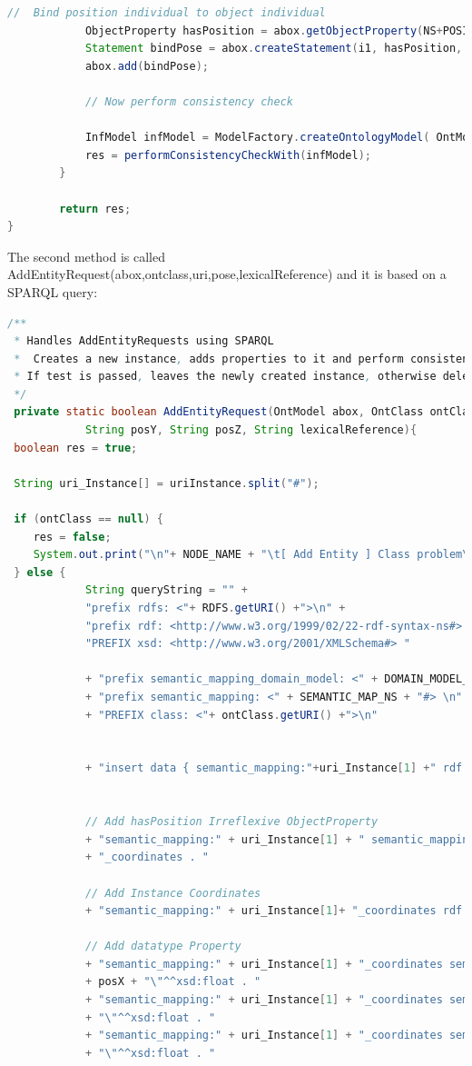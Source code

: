 \begin{lstlisting}[language=Java]
			//  Bind position individual to object individual
			ObjectProperty hasPosition = abox.getObjectProperty(NS+POSITION);
			Statement bindPose = abox.createStatement(i1, hasPosition, coordinatesInd);
			abox.add(bindPose);
			
			// Now perform consistency check

		    InfModel infModel = ModelFactory.createOntologyModel( OntModelSpec.OWL_MEM_MICRO_RULE_INF, abox);
			res = performConsistencyCheckWith(infModel);
		}
		
		return res;
}
\end{lstlisting}

The second method is called AddEntityRequest(abox,ontclass,uri,pose,lexicalReference) and it is based on a SPARQL query:

\begin{lstlisting}[language=Java]
/**
 * Handles AddEntityRequests using SPARQL
 *	Creates a new instance, adds properties to it and perform consistency check
 * If test is passed, leaves the newly created instance, otherwise deletes it
 */
 private static boolean AddEntityRequest(OntModel abox, OntClass ontClass, String uriInstance, String posX,
			String posY, String posZ, String lexicalReference){
 boolean res = true;
		
 String uri_Instance[] = uriInstance.split("#");
		
 if (ontClass == null) {
    res = false;
	System.out.print("\n"+ NODE_NAME + "\t[ Add Entity ] Class problem\n");
 } else {
			String queryString = "" + 
			"prefix rdfs: <"+ RDFS.getURI() +">\n" +
			"prefix rdf: <http://www.w3.org/1999/02/22-rdf-syntax-ns#> \n"+
			"PREFIX xsd: <http://www.w3.org/2001/XMLSchema#> "
			
			+ "prefix semantic_mapping_domain_model: <" + DOMAIN_MODEL_NS + "#> \n"
			+ "prefix semantic_mapping: <" + SEMANTIC_MAP_NS + "#> \n"
			+ "PREFIX class: <"+ ontClass.getURI() +">\n"
			
			
			+ "insert data { semantic_mapping:"+uri_Instance[1] +" rdf:type class: . "
			
			
			// Add hasPosition Irreflexive ObjectProperty 
			+ "semantic_mapping:" + uri_Instance[1] + " semantic_mapping_domain_model:hasPosition semantic_mapping:" + uri_Instance[1]
			+ "_coordinates . " 
			
			// Add Instance Coordinates 
			+ "semantic_mapping:" + uri_Instance[1]+ "_coordinates rdf:type semantic_mapping_domain_model:Coordinates . " 

			// Add datatype Property
			+ "semantic_mapping:" + uri_Instance[1] + "_coordinates semantic_mapping_domain_model:float_coordinates_x \""
			+ posX + "\"^^xsd:float . "
			+ "semantic_mapping:" + uri_Instance[1] + "_coordinates semantic_mapping_domain_model:float_coordinates_y \"" + posY
			+ "\"^^xsd:float . "
			+ "semantic_mapping:" + uri_Instance[1] + "_coordinates semantic_mapping_domain_model:float_coordinates_z \"" + posZ
			+ "\"^^xsd:float . "


\end{lstlisting}
